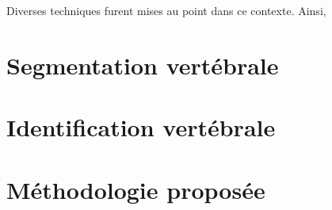         Diverses techniques furent mises au point dans ce contexte. Ainsi, \cite{}








\section{Segmentation vertébrale}

\section{Identification vertébrale}

\section{Méthodologie proposée}
